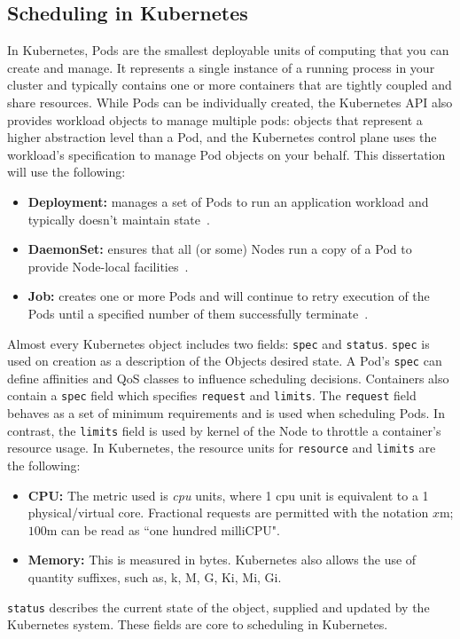 \subsection{Scheduling in Kubernetes}
In Kubernetes, Pods are the smallest deployable units of computing that you can
create and manage. It represents a single instance of a running
process in your cluster and typically contains one or more containers that are
tightly coupled and share resources. While Pods can be individually created,
the Kubernetes API also provides workload objects to manage multiple pods:
objects that represent a higher abstraction level than a Pod, and the Kubernetes
control plane uses the workload's specification to manage Pod objects on your
behalf. This dissertation will use the following:
\begin{itemize}
    \item \textbf{Deployment:} manages a set of Pods to run an application
        workload and typically doesn't maintain state~\cite{kube_deployments}.
    \item \textbf{DaemonSet:} ensures that all (or some) Nodes run a copy of a
        Pod to provide Node-local facilities~\cite{kube_daemonset}.
    \item \textbf{Job:} creates one or more Pods and will continue to retry
        execution of the Pods until a specified number of them successfully
        terminate~\cite{kube_jobs}.
\end{itemize}

Almost every Kubernetes object includes two fields: \verb|spec| and
\verb|status|. \verb|spec| is used on creation as a description of the Objects
desired state. A Pod's \texttt{spec} can define affinities and QoS classes to
influence scheduling decisions. Containers also contain a \verb|spec| field
which specifies \verb|request| and \verb|limits|. The \texttt{request} field
behaves as a set of minimum requirements and is used when scheduling Pods. In
contrast, the \texttt{limits} field is used by kernel of the Node to throttle a
container's resource usage. In Kubernetes, the resource units for
\texttt{resource} and \texttt{limits} are the following:
\begin{itemize}
    \item \textbf{CPU:} The metric used is \textit{cpu} units, where 1 cpu unit
        is equivalent to a 1 physical/virtual core. Fractional requests are
        permitted with the notation $x$m; $100$m can be read as ``one hundred
        milliCPU".
    \item \textbf{Memory:} This is measured in bytes. Kubernetes also allows the
        use of quantity suffixes, such as, k, M, G, Ki, Mi, Gi.
\end{itemize}
\texttt{status} describes the current state of the object, supplied and updated
by the Kubernetes system. These fields are core to scheduling in Kubernetes.

